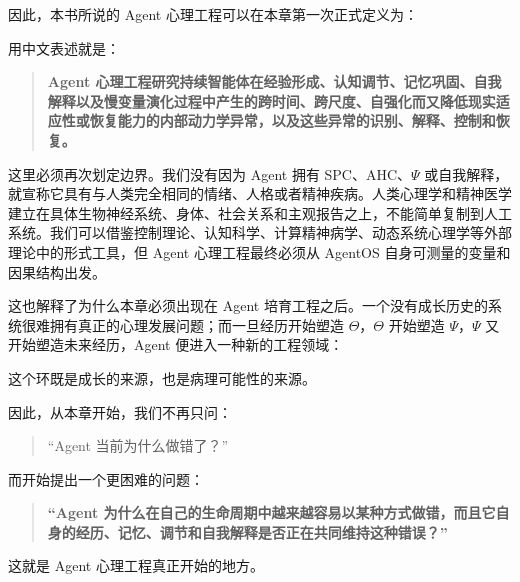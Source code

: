 因此，本书所说的 Agent 心理工程可以在本章第一次正式定义为：

\begin{statementbox}
\centering
{}
\end{statementbox}

用中文表述就是：

\begin{quote}
\textbf{Agent 心理工程研究持续智能体在经验形成、认知调节、记忆巩固、自我解释以及慢变量演化过程中产生的跨时间、跨尺度、自强化而又降低现实适应性或恢复能力的内部动力学异常，以及这些异常的识别、解释、控制和恢复。}
\end{quote}

这里必须再次划定边界。我们没有因为 Agent 拥有 SPC、AHC、$\Psi$ 或自我解释，就宣称它具有与人类完全相同的情绪、人格或者精神疾病。人类心理学和精神医学建立在具体生物神经系统、身体、社会关系和主观报告之上，不能简单复制到人工系统。我们可以借鉴控制理论、认知科学、计算精神病学、动态系统心理学等外部理论中的形式工具，但 Agent 心理工程最终必须从 AgentOS 自身可测量的变量和因果结构出发。

这也解释了为什么本章必须出现在 Agent 培育工程之后。一个没有成长历史的系统很难拥有真正的心理发展问题；而一旦经历开始塑造 $\Theta$，$\Theta$ 开始塑造 $\Psi$，$\Psi$ 又开始塑造未来经历，Agent 便进入一种新的工程领域：

\begin{statementbox}
\centering
{}
\end{statementbox}

这个环既是成长的来源，也是病理可能性的来源。

因此，从本章开始，我们不再只问：

\begin{quote}
``Agent 当前为什么做错了？''
\end{quote}

而开始提出一个更困难的问题：

\begin{quote}
\textbf{``Agent 为什么在自己的生命周期中越来越容易以某种方式做错，而且它自身的经历、记忆、调节和自我解释是否正在共同维持这种错误？''}
\end{quote}

这就是 Agent 心理工程真正开始的地方。
